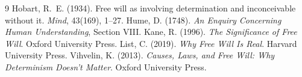 \documentclass{situationist-preprint}
\begin{document}
\begin{thebibliography}{9}
 Hobart, R.~E. (1934). Free will as involving determination and inconceivable without it. \emph{Mind}, 43(169), 1--27.
 Hume, D. (1748). \emph{An Enquiry Concerning Human Understanding}, Section VIII.
 Kane, R. (1996). \emph{The Significance of Free Will}. Oxford University Press.
 List, C. (2019). \emph{Why Free Will Is Real}. Harvard University Press.
 Vihvelin, K. (2013). \emph{Causes, Laws, and Free Will: Why Determinism Doesn't Matter}. Oxford University Press.
\end{thebibliography}
\end{document}
